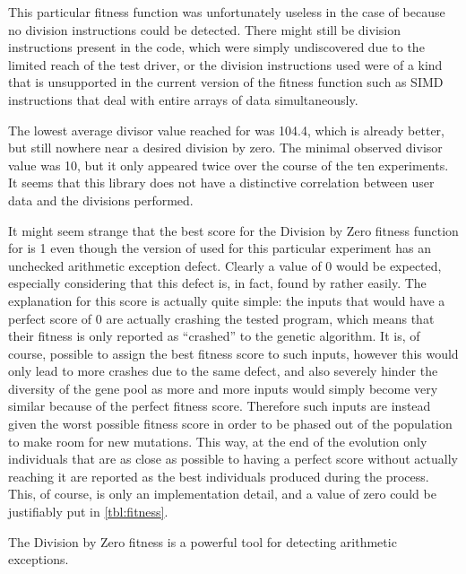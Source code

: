 This particular fitness function was unfortunately useless in the case of \libpcap because no division
instructions could be detected. There might still be division instructions present in the code, which were
simply undiscovered due to the limited reach of the test driver, or the division instructions used were of a
kind that is unsupported in the current version of the fitness function such as SIMD instructions that deal
with entire arrays of data simultaneously.

The lowest average divisor value reached for \libxml was 104.4, which is already better, but still nowhere near
a desired division by zero. The minimal observed divisor value was 10, but it only appeared twice over the
course of the ten experiments. It seems that this library does not have a distinctive correlation between user
data and the divisions performed.

It might seem strange that the best score for the Division by Zero fitness function for \libpng is 1 even
though the version of \libpng used for this particular experiment has an unchecked arithmetic exception
defect. Clearly a value of 0 would be expected, especially considering that this defect is, in
fact, found by \xmlmate rather easily. The explanation for this score is actually quite simple: the inputs
that would have a perfect score of 0 are actually crashing the tested program, which means that their
fitness is only reported as ``crashed'' to the genetic algorithm. It is, of course, possible to assign
the best fitness score to such inputs, however this would only lead to more crashes due to the same
defect, and also severely hinder the diversity of the gene pool as more and more inputs would simply become
very similar because of the perfect fitness score. Therefore such inputs are instead given the worst possible
fitness score in order to be phased out of the population to make room for new mutations. This way, at the end
of the evolution only individuals that are as close as possible to having a perfect score without actually
reaching it are reported as the best individuals produced during the process. This, of course, is only an
implementation detail, and a value of zero could be justifiably put in \cref{tbl:fitness}.

\begin{mdframed}
\centering
The Division by Zero fitness is a powerful tool for detecting arithmetic exceptions.
\end{mdframed}

